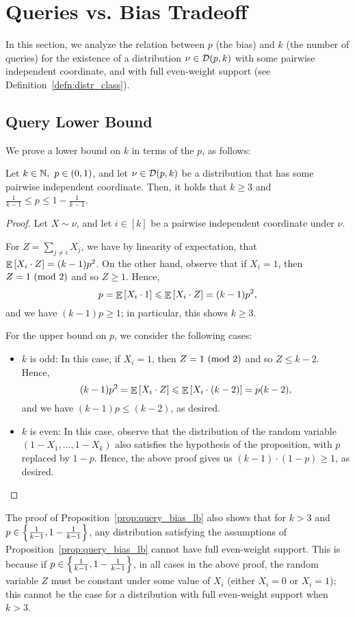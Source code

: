 \section{Queries vs. Bias Tradeoff}\label{sec:query_bias}

In this section, we analyze the relation between $p$ (the bias) and $k$ (the number of queries) for the existence of a distribution $\nu \in \mathcal D(p,k)$ with some pairwise independent coordinate, and with full even-weight support (see Definition~\ref{defn:distr_class}).

\subsection{Query Lower Bound}

We prove a lower bound on $k$ in terms of the $p$, as follows:
\begin{proposition}\label{prop:query_bias_lb}
	Let $k\in \mathbb{N},\ p\in (0,1)$, and let $\nu \in \mathcal D(p,k)$ be a distribution that has some pairwise independent coordinate.
	Then, it holds that $k\geq 3$ and  $\frac{1}{k-1} \leq p \leq 1-\frac{1}{k-1}$.
\end{proposition}
\begin{proof}
	Let $X\sim \nu$, and let $i\in [k]$ be a pairwise independent coordinate under $\nu$.
	
	For $Z = \sum_{j\not=i} X_j$, we have by linearity of expectation, that $\mathop{\mathbb{E}}\left[ X_i\cdot Z \right] = (k-1)p^2$.
	On the other hand, observe that if $X_i = 1$, then $Z = 1 \textnormal{ (mod 2)}$ and so $Z\geq 1$.
	Hence,
	\[p = \mathop{\mathbb{E}}\left[ X_i\cdot 1 \right]\leqslant  \mathop{\mathbb{E}}\left[ X_i\cdot Z \right] = (k-1)p^2, \]
	and we have $(k-1)p \geq 1$; in particular, this shows $k\geq 3$.
	
	For the upper bound on $p$, we consider the following cases:
	\begin{itemize}
		\item $k$ is odd: In this case, if $X_i=1$, then $Z = 1 \textnormal{ (mod 2)}$ and so $Z\leq k-2$. Hence,
		\[ (k-1)p^2 = \mathop{\mathbb{E}}\left[ X_i\cdot Z \right] \leqslant  \mathop{\mathbb{E}}\left[ X_i\cdot (k-2) \right] = p(k-2),\]
		and we have $(k-1)p \leq (k-2)$, as desired.
		\item $k$ is even: In this case, observe that the distribution of the random variable $(1-X_1, \dots, 1-X_k)$ also satisfies the hypothesis of the proposition, with $p$ replaced by $1-p$. Hence, the above proof gives us $(k-1)\cdot (1-p) \geq 1$, as desired. \qedhere
	\end{itemize}
\end{proof}
\begin{remark}\label{remark:corner_case_full_support}
The proof of Proposition~\ref{prop:query_bias_lb} also shows that for $k>3$ and $p\in \left\{ \frac{1}{k-1}, 1-\frac{1}{k-1} \right\}$, any distribution satisfying the assumptions of Proposition~\ref{prop:query_bias_lb} cannot have full even-weight support.
This is because if $p\in \left\{ \frac{1}{k-1}, 1-\frac{1}{k-1} \right\}$, in all cases in the above proof, the random variable $Z$ must be constant under some value of $X_i$ (either $X_i=0$ or $X_i=1$); this cannot be the case for a distribution with full even-weight support when $k>3$.
\end{remark}

